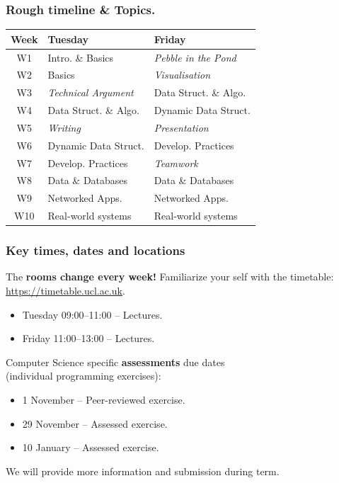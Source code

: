 \documentclass{beamer} %
\newcommand\emc[1]{\textcolor{brightblue}{\textbf{#1}}}
\begin{document}
\begin{frame}
\frametitle{Rough timeline \& Topics.} 

\begin{center}
\begin{tabular}{ c l l }
\hline 
 {\bf Week} & {\bf Tuesday} & {\bf Friday} \\ 
\hline 
W1  & Intro. \& Basics  & \emph{Pebble in the Pond}  \\  
W2  &  Basics & \emph{Visualisation} \\
W3  &  \emph{Technical Argument} & Data Struct. \& Algo.  \\
W4  &  Data Struct. \& Algo. & Dynamic Data Struct. \\
W5  & \emph{Writing} & \emph{Presentation} \\
W6  &  Dynamic Data Struct. & Develop. Practices \\
W7  &  Develop. Practices & \emph{Teamwork} \\
W8  &  Data \& Databases & Data \& Databases \\
W9  &  Networked Apps. & Networked Apps. \\
W10  & Real-world systems & Real-world systems \\
 \hline     
\end{tabular}
\end{center}

\end{frame}

\begin{frame}
\frametitle{Key times, dates and locations} 

The \emc{rooms change every week!}
Familiarize your self with the timetable: \url{https://timetable.ucl.ac.uk}.

\begin{itemize}
	\item Tuesday 09:00--11:00 -- Lectures.
	\item Friday 11:00--13:00 -- Lectures.
\end{itemize}

\vspace{3mm}
Computer Science specific \emc{assessments} due dates \\ (individual programming exercises):
\begin{itemize}
	\item 1 November -- Peer-reviewed exercise.
	\item 29 November -- Assessed exercise.
	\item 10 January -- Assessed exercise.
\end{itemize}
We will provide more information and submission during term.


\end{frame}
\end{document}
